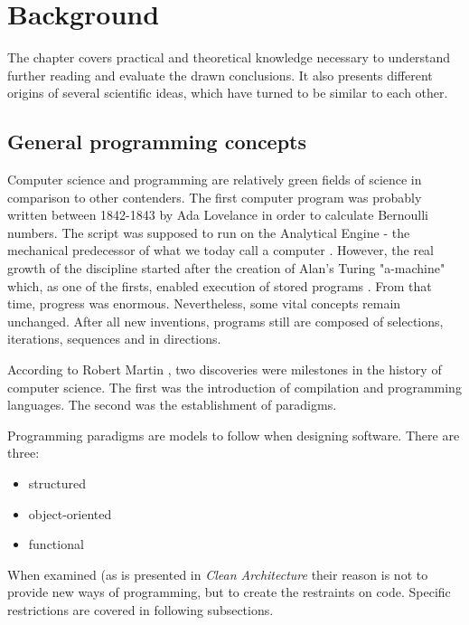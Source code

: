 \chapter{Background}
\label{cha:background}

The chapter covers practical and theoretical knowledge necessary to understand further reading and evaluate the drawn conclusions. It also presents different origins of several scientific ideas, which have turned to be similar to each other.
\section{General programming concepts}
\label{sec:programmingConcepts}

Computer science and programming are relatively green fields of science in comparison to other contenders. The first computer program was probably written between 1842-1843 by Ada Lovelance in order to calculate Bernoulli numbers. The script was supposed to run on the Analytical Engine - the mechanical predecessor of what we today call a computer \cite{history}. However, the real growth of the discipline started after the creation of Alan's Turing "a-machine" which, as one of the firsts, enabled execution of stored programs \cite{history}. From that time, progress was enormous. Nevertheless, some vital concepts remain unchanged. After all new inventions, programs still are composed of selections, iterations, sequences and in directions.

According to Robert Martin \cite{cleanArch}, two discoveries were milestones in the history of computer science. The first was the introduction of compilation and programming languages. The second was the establishment of paradigms.

Programming paradigms are models to follow when designing software. There are three: 
\begin{itemize}
\item structured
\item object-oriented
\item functional
\end{itemize}
When examined (as is presented in \textit{Clean Architecture} \cite{cleanArch} their reason is not to provide new ways of programming, but to create the restraints on code. Specific restrictions are covered in following subsections. 


